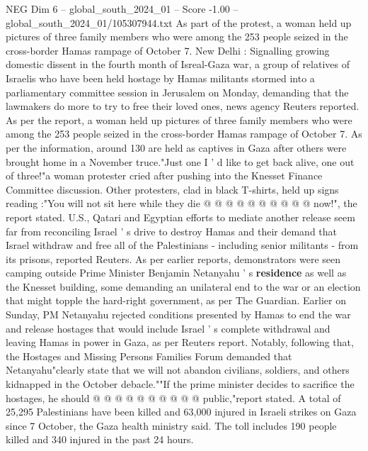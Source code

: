 \begin{textsample}{NEG Dim 6 – global\_south\_2024\_01 – Score -1.00 – global\_south\_2024\_01/105307944.txt}  \label{ex:f6_neg_369}
As part of the protest, a woman held up pictures of three family members who were among the 253 people seized in the cross-border Hamas rampage of October 7.
New Delhi : Signalling growing domestic dissent in the fourth month of Isreal-Gaza war, a group of relatives of Israelis who have been held hostage by Hamas militants stormed into a parliamentary committee session in Jerusalem on Monday, demanding that the lawmakers do more to try to free their loved ones, news agency Reuters reported.
As per the report, a woman held up pictures of three family members who were among the 253 people seized in the cross-border Hamas rampage of October 7.
As per the information, around 130 are held as captives in Gaza after others were brought home in a November truce."Just one I ' d like to get back alive, one out of three!"a woman protester cried after pushing into the Knesset Finance Committee discussion.
Other protesters, clad in black T-shirts, held up signs reading :"You will not sit here while they die @ @ @ @ @ @ @ @ @ @ now!", the report stated.
U.S., Qatari and Egyptian efforts to mediate another release seem far from reconciling Israel ' s drive to destroy Hamas and their demand that Israel withdraw and free all of the Palestinians - including senior militants - from its prisons, reported Reuters.
As per earlier reports, demonstrators were seen camping outside Prime Minister Benjamin Netanyahu ' s \textbf{residence} as well as the Knesset building, some demanding an unilateral end to the war or an election that might topple the hard-right government, as per The Guardian.
Earlier on Sunday, PM Netanyahu rejected conditions presented by Hamas to end the war and release hostages that would include Israel ' s complete withdrawal and leaving Hamas in power in Gaza, as per Reuters report.
Notably, following that, the Hostages and Missing Persons Families Forum demanded that Netanyahu"clearly state that we will not abandon civilians, soldiers, and others kidnapped in the October debacle.""If the prime minister decides to sacrifice the hostages, he should @ @ @ @ @ @ @ @ @ @ public,"report stated.
A total of 25,295 Palestinians have been killed and 63,000 injured in Israeli strikes on Gaza since 7 October, the Gaza health ministry said.
The toll includes 190 people killed and 340 injured in the past 24 hours.

\end{textsample}
